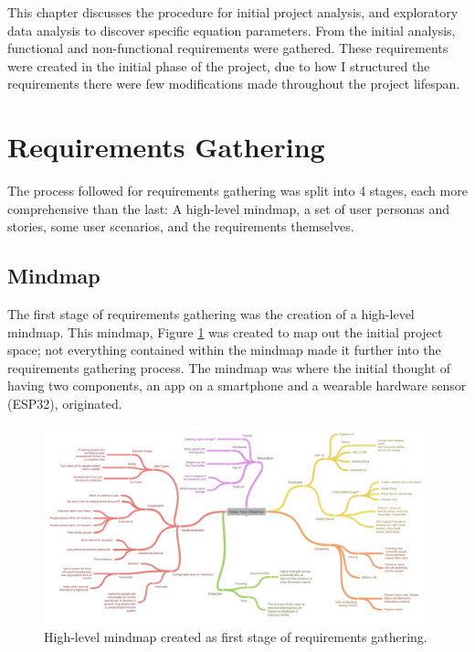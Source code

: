\documentclass{l4proj}
\begin{document}
This chapter discusses the procedure for initial project analysis, and exploratory data analysis to discover specific equation parameters. From the initial analysis, functional and non-functional requirements were gathered. These requirements were created in the initial phase of the project, due to how I structured the requirements there were few modifications made throughout the project lifespan.

\section{Requirements Gathering}

The process followed for requirements gathering was split into 4 stages, each more comprehensive than the last: A high-level mindmap, a set of user personas and stories, some user scenarios, and the requirements themselves.

\subsection{Mindmap}

The first stage of requirements gathering was the creation of a high-level mindmap. This mindmap, Figure \ref{fig:mindmap} was created to map out the initial project space; not everything contained within the mindmap made it further into the requirements gathering process. The mindmap was where the initial thought of having two components, an app on a smartphone and a wearable hardware sensor (ESP32), originated.

\begin{figure}[!htb]
    \centering
    \includegraphics[width=1.0\linewidth]{images/mindmap.png}

    \caption{ High-level mindmap created as first stage of requirements gathering. }

    \label{fig:mindmap}
\end{figure}
\end{document}
